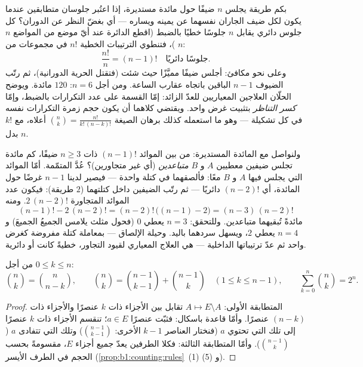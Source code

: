 \begin{example}\label{ex:b1:counting:roundtable}
بكم طريقة يجلس $n$ ضيفًا حول مائدة مستديرة، إذا اعتُبر جلوسان
متطابقين عندما يكون لكل ضيف الجاران نفسهما عن يمينه ويساره ---
أي بغضّ النظر عن الدوران؟ كل جلوس دائري يقابل $n$ جلوسًا خطيًا
بالضبط (اقطع الدائرة عند أيّ موضع من المواضع $n$)، فتنطوي
الترتيبات الخطية $n!$ في مجموعات من $n$:
\[
\frac{n!}{n} = (n-1)! \quad\text{جلوسًا دائريًا.}
\]
وعلى نحو مكافئ: أجلس ضيفًا مميَّزًا حيث شئت (فتقتل الحرية
الدورانية)، ثم رتّب الضيوف $n - 1$ الباقين باتجاه عقارب الساعة.
ومن أجل $n = 6$: $120$ مائدة. ويوضح الحلّان العلاجين المعياريين
للعدّ الزائد: إمّا القسمة على عدد التكرارات بالضبط، وإمّا
\emph{كسر التناظر} بتثبيت غرض واحد. ويقتضي كلاهما أن يكون حجم
زمرة التكرارات نفسه في كل تشكيلة --- وهو ما استعمله كذلك برهان
الصيغة $\binom nk = \frac{n!}{k!\,(n-k)!}$ أعلاه، مع $k!$ بدل $n$.
\end{example}

\begin{example}\label{ex:b1:counting:constraint}
ولنواصل مع المائدة المستديرة: من بين الموائد $(n-1)!$ ذات $n \geq
3$ ضيفًا، كم مائدة تجلس ضيفين معطيين $A$ و $B$
\emph{متباعدين} (أي غير متجاورين)؟ عُدَّ المتمّمة. أمّا الموائد
التي يجلس فيها $A$ و $B$ معًا: فألصقهما في كتلة واحدة --- فيصير
لدينا $n - 1$ غرضًا حول المائدة، أي $(n-2)!$  دائريًا ---
ثم رتّب الضيفين داخل كتلتهما ($2$ طريقة): فيكون عدد الموائد
المتجاورة $2\,(n-2)!$. ومنه
\[
(n-1)! - 2\,(n-2)! = (n-2)!\,\bigl((n - 1) - 2\bigr)
= (n-3)\,(n-2)!
\]
مائدةً تُبقيهما متباعدين. وللتحقق: $n = 3$ يعطي $0$ (فحول
مثلث يلامس الجميعُ الجميعَ) و $n = 4$ يعطي $2$، ويسهل سردهما
باليد. وحيلة الإلصاق --- بمعاملة كتلة مفروضة كغرض واحد ثم عدّ
ترتيباتها الداخلية --- هي العلاج المعياري لقيود التجاور، خطيةً
كانت أو دائرية.
\end{example}

\begin{proposition}\label{prop:b1:counting:identities}
من أجل $0 \leq k \leq n$:
\[
\binom{n}{k} = \binom{n}{n-k},
\qquad
\binom{n}{k} = \binom{n-1}{k-1} + \binom{n-1}{k}
\quad (1 \leq k \leq n-1),
\qquad
\sum_{k=0}^{n} \binom{n}{k} = 2^n .
\]
\end{proposition}

\begin{proof}
المتطابقة الأولى:  $A \mapsto E \setminus A$ تقابل بين الأجزاء ذات $k$ عنصرًا والأجزاء ذات $(n-k)$ عنصرًا. وأمّا قاعدة
باسكال: فثبّت عنصرًا $a \in E$؛ تنقسم الأجزاء
ذات $k$ عنصرًا إلى تلك التي تحتوي $a$ (فنختار العناصر $k - 1$
الأخرى: $\binom{n-1}{k-1}$) وتلك التي تتفادى $a$ ($\binom{n-1}{k}$).
وأمّا المتطابقة الثالثة: فكلا الطرفين يعدّ جميع أجزاء $E$، مقسومةً
بحسب الحجم في الطرف الأيسر
(\cref{prop:b1:counting:rules}~(1) و (5)).
\end{proof}

